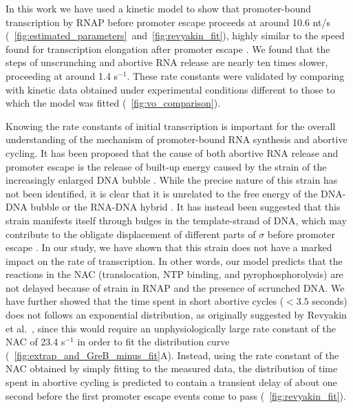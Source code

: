 %
In this work we have used a kinetic model to show that promoter-bound
transcription by RNAP before promoter escape proceeds at around 10.6 nt/s
(\FIGS~\ref{fig:estimated_parameters}~and~\ref{fig:revyakin_fit}), highly
similar to the speed found for transcription elongation after promoter
escape \cite{revyakin_abortive_2006}. We found that the steps of unscrunching
and abortive RNA release are nearly ten times slower, proceeding at around 1.4
s$^{-1}$. These rate constants were validated by comparing with kinetic data
obtained under experimental conditions different to those to which the model
was fitted (\FIG~\ref{fig:vo_comparison}).

Knowing the rate constants of initial transcription is important for the overall
understanding of the mechanism of promoter-bound RNA synthesis and abortive
cycling. It has been proposed that the cause of both abortive RNA release and
promoter escape is the release of built-up energy caused by the strain of the
increasingly enlarged DNA bubble \cite{straney_stressed_1987,
hsu_promoter_2002, revyakin_abortive_2006}. While the precise nature of this
strain has not been identified, it is clear that it is unrelated to the free
energy of the DNA-DNA bubble or the RNA-DNA hybrid \cite{hsu_initial_2006,
skancke_sequence-dependent_2015}. It has instead been suggested that this
strain manifests itself through bulges in the template-strand of DNA, which
may contribute to the obligate displacement of different parts of $\sigma$
before promoter escape \cite{winkelman_crosslink_2015}. In our study, we have
shown that this strain does not have a marked impact on the rate of
transcription. In other words, our model predicts that the reactions in the
NAC (translocation, NTP binding, and pyrophosphorolysis) are not delayed
because of strain in RNAP and the presence of scrunched DNA. We have further
showed that the time spent in short abortive cycles ($< 3.5$ seconds) does not
follows an exponential distribution, as originally suggested by Revyakin et
al.\ \cite{revyakin_abortive_2006}, since this would require an
unphysiologically large rate constant of the NAC of 23.4 s$^{-1}$ in order to
fit the distribution curve (\FIG~\ref{fig:extrap_and_GreB_minus_fit}A).
Instead, using the rate constant of the NAC obtained by simply fitting to the
measured data, the distribution of time spent in abortive cycling is predicted
to contain a transient delay of about one second before the first promoter
escape events come to pass (\FIG~\ref{fig:revyakin_fit}).

